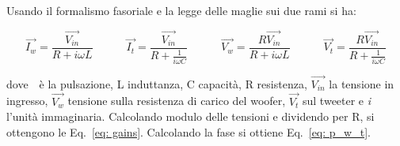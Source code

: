 \documentclass[../Relazione_circuiti]{subfiles}
\begin{document}
Usando il formalismo fasoriale e la legge delle maglie sui due rami si ha:

\begin{equation*}
  \overrightarrow{I_{w}} = \frac{\overrightarrow{V_{in}}}{R+i \omega L} \qquad \quad %
  \overrightarrow{I_{t}} = \frac{\overrightarrow{V_{in}}}{R+\frac{1}{i \omega C}} \qquad \quad %
    \overrightarrow{V_{w}} = \frac{R \overrightarrow{V_{in}}}{R+i \omega L} \qquad \quad %
  \overrightarrow{V_{t}} = \frac{R \overrightarrow{V_{in}}}{R+\frac{1}{i \omega C}}  
\end{equation*}

dove \textomega \,\ è la pulsazione, L induttanza, C capacità, R resistenza, $\overrightarrow{V_{in}}$ la tensione in ingresso, $\overrightarrow{V_{w}}$ tensione sulla resistenza di carico del woofer, $\overrightarrow{V_{t}}$ sul tweeter e \textit{i} l'unità immaginaria.
Calcolando modulo delle tensioni e dividendo per R, si ottengono le Eq.\, \eqref{eq: gains}. Calcolando la fase si ottiene Eq.\, \eqref{eq: p_w_t}.
\end{document}
